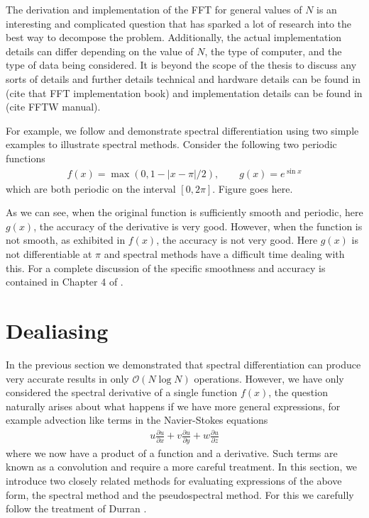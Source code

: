 The derivation and implementation of the FFT for general values of $N$ is an interesting and complicated question that has sparked a lot of research into the best way to decompose the problem. Additionally, the actual implementation details can differ depending on the value of $N$, the type of computer, and the type of data being considered. It is beyond the scope of the thesis to discuss any sorts of details and further details technical and hardware details can be found in (cite that FFT implementation book) and implementation details can be found in (cite FFTW manual).

For example, we follow \cite{trefethen_spectral} and demonstrate spectral differentiation using two simple examples to illustrate spectral methods. Consider the following two periodic functions
\begin{align}
f(x) = \max(0,1-|x-\pi|/2), \qquad g(x)=e^{\sin x}
\end{align}
which are both periodic on the interval $[0,2\pi]$.  Figure goes here. 

As we can see, when the original function is sufficiently smooth and periodic, here $g(x)$, the accuracy of the derivative is very good. However, when the function is not smooth, as exhibited in $f(x)$, the accuracy is not very good. Here $g(x)$ is not differentiable at $\pi$ and spectral methods have a difficult time dealing with this. For a complete discussion of the specific smoothness and accuracy is contained in Chapter 4 of \cite{trefethen_spectral}.
\section{Dealiasing} 
In the previous section we demonstrated that spectral differentiation can produce very accurate results in only $\mathcal{O}(N\log N)$ operations. However, we have only considered the spectral derivative of a single function $f(x)$, the question naturally arises about what happens if we have more general expressions, for example advection like terms in the Navier-Stokes equations 
\begin{align}
u\frac{\partial u}{\partial x} + v\frac{\partial u}{\partial y} +w\frac{\partial u}{\partial z}
\end{align}
where we now have a product of a function and a derivative. Such terms are known as a convolution and require a more careful treatment. In this section, we introduce two closely related methods for evaluating expressions of the above form, the spectral method and the pseudospectral method. For this we carefully follow the treatment of Durran \cite{durran}. 


